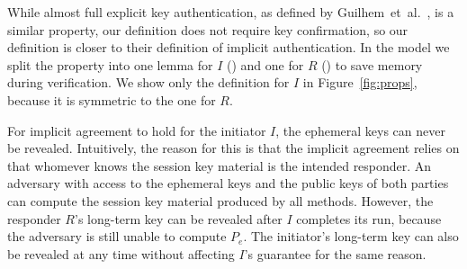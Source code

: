 %
While almost full explicit key authentication, as defined by
Guilhem~et~al.~\cite{DBLP:conf/csfw/GuilhemFW20}, is a similar property, our
definition does not require key confirmation, so our definition is closer to
their definition of implicit authentication.
%
In the \mTamarin{} model we split the property into one lemma for
$I$ (\mPredImpI{}) and one for $R$ (\mPredImpR{}) to save memory during
verification.
%
We show only the definition for $I$ in Figure~\ref{fig:props}, because it is
symmetric to the one for $R$.
%

For implicit agreement to hold for the initiator $I$, the ephemeral keys
can never be revealed.
%
Intuitively, the reason for this is that the implicit agreement relies on that
whomever knows the session key material is the intended responder.
%
An adversary with access to the ephemeral keys and the public keys of
both parties can compute the session key material produced by all methods.
%
However, the responder $R$'s long-term key can be revealed after $I$ completes
its run, because the adversary is still unable to compute $P_e$.
%
The initiator's long-term key can also be revealed at any time without affecting
$I$'s guarantee for the same reason.
%
